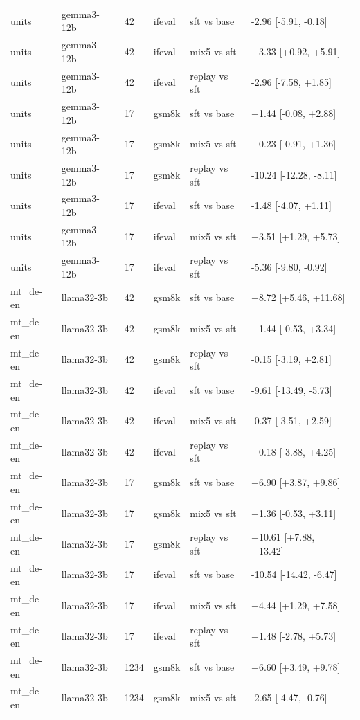 \begin{table}[t]
\begin{tabular}{llllll}
units & gemma3-12b & 42 & ifeval & sft vs base & -2.96 [-5.91, -0.18] \\
units & gemma3-12b & 42 & ifeval & mix5 vs sft & +3.33 [+0.92, +5.91] \\
units & gemma3-12b & 42 & ifeval & replay vs sft & -2.96 [-7.58, +1.85] \\
units & gemma3-12b & 17 & gsm8k & sft vs base & +1.44 [-0.08, +2.88] \\
units & gemma3-12b & 17 & gsm8k & mix5 vs sft & +0.23 [-0.91, +1.36] \\
units & gemma3-12b & 17 & gsm8k & replay vs sft & -10.24 [-12.28, -8.11] \\
units & gemma3-12b & 17 & ifeval & sft vs base & -1.48 [-4.07, +1.11] \\
units & gemma3-12b & 17 & ifeval & mix5 vs sft & +3.51 [+1.29, +5.73] \\
units & gemma3-12b & 17 & ifeval & replay vs sft & -5.36 [-9.80, -0.92] \\
mt\_de-en & llama32-3b & 42 & gsm8k & sft vs base & +8.72 [+5.46, +11.68] \\
mt\_de-en & llama32-3b & 42 & gsm8k & mix5 vs sft & +1.44 [-0.53, +3.34] \\
mt\_de-en & llama32-3b & 42 & gsm8k & replay vs sft & -0.15 [-3.19, +2.81] \\
mt\_de-en & llama32-3b & 42 & ifeval & sft vs base & -9.61 [-13.49, -5.73] \\
mt\_de-en & llama32-3b & 42 & ifeval & mix5 vs sft & -0.37 [-3.51, +2.59] \\
mt\_de-en & llama32-3b & 42 & ifeval & replay vs sft & +0.18 [-3.88, +4.25] \\
mt\_de-en & llama32-3b & 17 & gsm8k & sft vs base & +6.90 [+3.87, +9.86] \\
mt\_de-en & llama32-3b & 17 & gsm8k & mix5 vs sft & +1.36 [-0.53, +3.11] \\
mt\_de-en & llama32-3b & 17 & gsm8k & replay vs sft & +10.61 [+7.88, +13.42] \\
mt\_de-en & llama32-3b & 17 & ifeval & sft vs base & -10.54 [-14.42, -6.47] \\
mt\_de-en & llama32-3b & 17 & ifeval & mix5 vs sft & +4.44 [+1.29, +7.58] \\
mt\_de-en & llama32-3b & 17 & ifeval & replay vs sft & +1.48 [-2.78, +5.73] \\
mt\_de-en & llama32-3b & 1234 & gsm8k & sft vs base & +6.60 [+3.49, +9.78] \\
mt\_de-en & llama32-3b & 1234 & gsm8k & mix5 vs sft & -2.65 [-4.47, -0.76] \\

\end{tabular}
\end{table}
